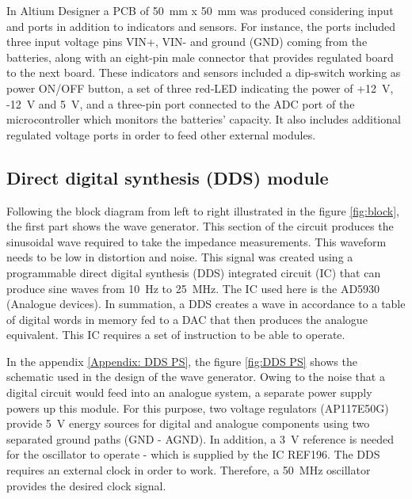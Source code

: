 In Altium Designer a PCB of \SI{50}{\milli\meter} x \SI{50}{\milli\meter} was produced considering input and ports in addition to indicators and sensors. For instance, the ports included three input voltage pins VIN+, VIN- and ground (GND) coming from the batteries, along with an eight-pin male connector that provides regulated board to the next board. These indicators and sensors included a dip-switch working as power ON/OFF button, a set of three red-LED indicating the power of +\SI{12}{\volt}, -\SI{12}{\volt} and \SI{5}{\volt}, and a three-pin port connected to the ADC port of the microcontroller which monitors the batteries' capacity. It also includes additional regulated voltage ports in order to feed other external modules.

\subsection{Direct digital synthesis (DDS) module}
\label{section DDS}
Following the block diagram from left to right illustrated in the figure \ref{fig:block}, the first part shows the wave generator. This section of the circuit produces the sinusoidal wave required to take the impedance measurements. This waveform needs to be low in distortion and noise. This signal was created using a programmable direct digital synthesis (DDS) integrated circuit (IC) that can produce sine waves from \SI{10}{\hertz} to \SI{25}{\mega\hertz}. The IC used here is the AD5930 (Analogue devices). In summation, a DDS creates a wave in accordance to a table of digital words in memory fed to a DAC that then produces the analogue equivalent. This IC requires a set of instruction to be able to operate. 

In the appendix \ref{Appendix: DDS PS}, the figure \ref{fig:DDS PS} shows the schematic used in the design of the wave generator. Owing to the noise that a digital circuit would feed into an analogue system, a separate power supply powers up this module. For this purpose, two voltage regulators (AP117E50G) provide \SI{5}{\volt} energy sources for digital and analogue components using two separated ground paths (GND - AGND). In addition, a \SI{3}{\volt} reference is needed for the oscillator to operate - which is supplied by the IC REF196. The DDS requires an external clock in order to work. Therefore, a \SI{50}{\mega\hertz} oscillator provides the desired clock signal.

